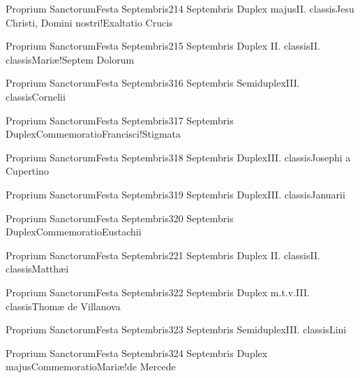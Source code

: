\documentclass[psalterium-feriale.tex]{subfiles}
\begin{document}
	{Proprium Sanctorum}{Festa Septembris}{2}{14 Septembris}
	{Duplex majus}{II. classis}{Jesu Christi, Domini nostri!Exaltatio Crucis}
	{}
	{}
\psalmodiapropria

	{Proprium Sanctorum}{Festa Septembris}{2}{15 Septembris}
	{Duplex II. classis}{II. classis}{Mariæ!Septem Dolorum}
	{}
	{}
\psalmodiapropria

	{Proprium Sanctorum}{Festa Septembris}{3}{16 Septembris}
	{Semiduplex}{III. classis}{Cornelii}
	{}
	{}
\PMEXaRubric

	{Proprium Sanctorum}{Festa Septembris}{3}{17 Septembris}
	{Duplex}{Commemoratio}{Francisci!Stigmata}
	{}
	{}

	{Proprium Sanctorum}{Festa Septembris}{3}{18 Septembris}
	{Duplex}{III. classis}{Josephi a Cupertino}
	{}
	{}
\COPObRubric

	{Proprium Sanctorum}{Festa Septembris}{3}{19 Septembris}
	{Duplex}{III. classis}{Januarii}
	{}
	{}
\PMEXbRubric

	{Proprium Sanctorum}{Festa Septembris}{3}{20 Septembris}
	{Duplex}{Commemoratio}{Eustachii}
	{}
	{}
\PMEXbRubric

	{Proprium Sanctorum}{Festa Septembris}{2}{21 Septembris}
	{Duplex II. classis}{II. classis}{Matthæi}
	{}
	{}
\psalmodiapropria

	{Proprium Sanctorum}{Festa Septembris}{3}{22 Septembris}
	{Duplex m.t.v.}{III. classis}{Thomæ de Villanova}
	{}
	{}
\COPObRubric

	{Proprium Sanctorum}{Festa Septembris}{3}{23 Septembris}
	{Semiduplex}{III. classis}{Lini}
	{}
	{}
\UMEXaRubric

	{Proprium Sanctorum}{Festa Septembris}{3}{24 Septembris}
	{Duplex majus}{Commemoratio}{Mariæ!de Mercede}
	{}
	{}
\psalmodiapropria
\end{document}
